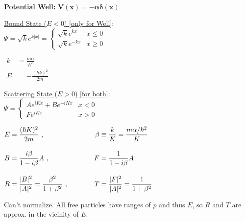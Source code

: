 \documentclass[12pt]{article}
\begin{document}
\vspace{15pt}
\textbf{Potential Well:} \indent \indent \indent 
    \( \boldsymbol{ V(x) = - \alpha \delta(x) } \) 
    \indent{}

\vspace{25pt} \noindent
\begin{minipage}[t]{.45\textwidth}
    \setlength{\parindent}{.5cm}
    \noindent
    \underline{Bound State (\(E<0\)) {\scriptsize[only for Well]}}: \\[10pt]
    \indent \( \Psi = \sqrt{k} e^{k|x|} = \begin{cases} 
        \sqrt{k} e^{kx}  &   x \leq 0\\
        \sqrt{k} e^{-kx} &   x \geq 0
    \end{cases}\)
    
    \vspace{20pt} \noindent
    \(\begin{aligned}
        k &= \frac{m \alpha}{\hbar^2}\\[5pt]
        E &= - \frac{(\hbar k)^2}{2m}
    \end{aligned}\)    
\end{minipage}
\begin{minipage}[t]{.5\textwidth}
    \setlength{\parindent}{.5cm}
    \noindent
    \underline{Scattering State (\(E>0\)) {\scriptsize[for both]}}:\\[10pt] 
    \indent \(\Psi = \begin{cases}
        A e^{iKx} + B e^{-iKx}  &   x < 0\\
        F e^{iKx}               &   x > 0
    \end{cases}\)
    
    \vspace{20pt} \noindent
    \(\begin{aligned}
        E &= \frac{(\hbar K)^2}{2m} \ , & 
            \beta &\equiv \frac{k}{K} = \frac{m \alpha / \hbar^2}{K}\\[10pt]
        B &= \frac{i\beta}{1 - i\beta} A \ , &
            F &= \frac{1}{1- i\beta} A\\[10pt]
        R &= \frac{|B|^2}{|A|^2} = \frac{\beta^2}{1+\beta^2} \ , & \indent \indent
            T &= \frac{|F|^2}{|A|^2} = \frac{1}{1+\beta^2}
    \end{aligned}\)    

    \vspace{20pt} \noindent
    {\scriptsize Can't normalize. 
    All free particles have ranges of \(p\) and thus \(E\), so \(R\) and \(T\) are approx.
    in the vicinity of \(E\).}
\end{minipage}
\end{document}
